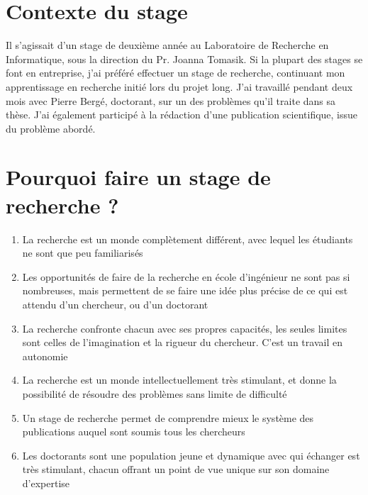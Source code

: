 \documentclass[a0,portrait]{a0poster}
\begin{document}
\vspace{1cm} %


\begin{multicols}{2} %


\section*{Contexte du stage}

Il s'agissait d'un stage de deuxième année au Laboratoire de Recherche en Informatique, sous la direction du Pr. Joanna Tomasik. Si la plupart des stages se font en entreprise, j'ai préféré effectuer un stage de recherche, continuant mon apprentissage en recherche initié lors du projet long. J'ai travaillé pendant deux mois avec Pierre Bergé, doctorant, sur un des problèmes qu'il traite dans sa thèse. J'ai également participé à la rédaction d'une publication scientifique, issue du problème abordé.



\color{NavyBlue}

\section*{Pourquoi faire un stage de recherche ?}

\begin{enumerate}
\item La recherche est un monde complètement différent, avec lequel les étudiants ne sont que peu familiarisés
\item Les opportunités de faire de la recherche en école d'ingénieur ne sont pas si nombreuses, mais permettent de se faire une idée plus précise de ce qui est attendu d'un chercheur, ou d'un doctorant
\item La recherche confronte chacun avec ses propres capacités, les seules limites sont celles de l'imagination et la rigueur du chercheur. C'est un travail en autonomie
\item La recherche est un monde intellectuellement très stimulant, et donne la possibilité de résoudre des problèmes sans limite de difficulté
\item Un stage de recherche permet de comprendre mieux le système des publications auquel sont soumis tous les chercheurs
\item Les doctorants sont une population jeune et dynamique avec qui échanger est très stimulant, chacun offrant un point de vue unique sur son domaine d'expertise


\end{enumerate}
\end{multicols}
\end{document}
